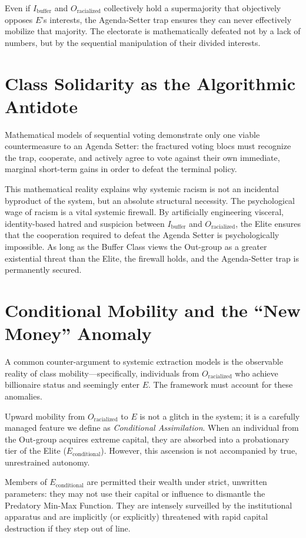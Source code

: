 \documentclass[12pt,openany]{book}
\begin{document}
Even if $I_{\text{buffer}}$ and $O_{\text{racialized}}$ collectively hold a supermajority that objectively opposes $E$'s interests, the Agenda-Setter trap ensures they can never effectively mobilize that majority. The electorate is mathematically defeated not by a lack of numbers, but by the sequential manipulation of their divided interests.
\section{Class Solidarity as the Algorithmic Antidote}

Mathematical models of sequential voting demonstrate only one viable countermeasure to an Agenda Setter: the fractured voting blocs must recognize the trap, cooperate, and actively agree to vote against their own immediate, marginal short-term gains in order to defeat the terminal policy.

This mathematical reality explains why systemic racism is not an incidental byproduct of the system, but an absolute structural necessity. The psychological wage of racism is a vital systemic firewall. By artificially engineering visceral, identity-based hatred and suspicion between $I_{\text{buffer}}$ and $O_{\text{racialized}}$, the Elite ensures that the cooperation required to defeat the Agenda Setter is psychologically impossible. As long as the Buffer Class views the Out-group as a greater existential threat than the Elite, the firewall holds, and the Agenda-Setter trap is permanently secured.
\section{Conditional Mobility and the ``New Money'' Anomaly}

A common counter-argument to systemic extraction models is the observable reality of class mobility---specifically, individuals from $O_{\text{racialized}}$ who achieve billionaire status and seemingly enter $E$. The framework must account for these anomalies.

Upward mobility from $O_{\text{racialized}}$ to $E$ is not a glitch in the system; it is a carefully managed feature we define as \textit{Conditional Assimilation}. When an individual from the Out-group acquires extreme capital, they are absorbed into a probationary tier of the Elite ($E_{\text{conditional}}$). However, this ascension is not accompanied by true, unrestrained autonomy.

Members of $E_{\text{conditional}}$ are permitted their wealth under strict, unwritten parameters: they may not use their capital or influence to dismantle the Predatory Min-Max Function. They are intensely surveilled by the institutional apparatus and are implicitly (or explicitly) threatened with rapid capital destruction if they step out of line.
\end{document}
